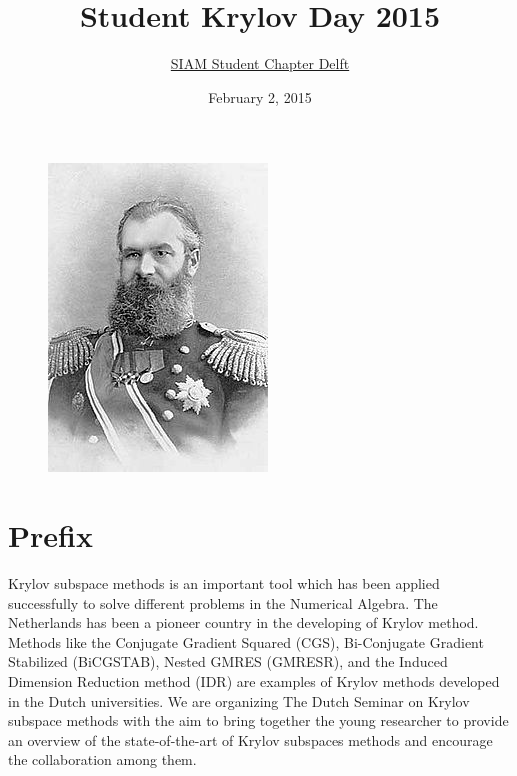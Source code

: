 \documentclass{article}
\title{\bf Student Krylov Day 2015}
\author{\href{http://sscdelft.github.io/activities/2015/02/02/krylov-day.html}{SIAM Student Chapter Delft}}
\date{February 2, 2015}
\begin{document}
\maketitle
\begin{figure}[h]
 \centering
 \includegraphics{220px-Alexey_Krylov_1910s.JPG}
\end{figure}

\section*{Prefix}
Krylov subspace methods is an important tool which has been applied successfully to solve different problems 
in the Numerical Algebra. The Netherlands has been a pioneer country in the developing of Krylov method.
Methods like the Conjugate Gradient Squared (CGS), Bi-Conjugate Gradient Stabilized (BiCGSTAB), Nested GMRES (GMRESR), and the Induced Dimension Reduction method (IDR)  
are examples of Krylov methods developed in the Dutch universities. 
We are organizing The Dutch Seminar on Krylov subspace methods with the aim 
to bring together the young researcher to provide an
overview of the state-of-the-art of Krylov subspaces methods and encourage 
the collaboration among them.
\newpage
\end{document}
